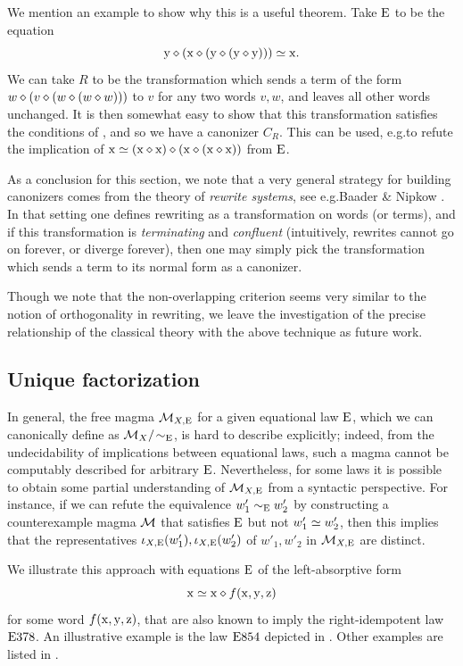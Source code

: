 We mention an example to show why this is a useful theorem. Take $\mathrm{E}$ to be the equation
\[
  \mathrm{y} \diamond (\mathrm{x} \diamond (\mathrm{y} \diamond (\mathrm{y} \diamond \mathrm{y})))\simeq \mathrm{x}.
\]
We can take $R$ to be the transformation which sends a term of the form $w \diamond (v \diamond (w \diamond (w \diamond w)))$ to $v$ for any two words $v, w$, and leaves all other words unchanged.
It is then somewhat easy to show that this transformation satisfies the conditions of , and so we have a canonizer $C_R$.
This can be used, e.g.\@ to refute the implication of $\mathrm{x} \simeq (\mathrm{x} \diamond \mathrm{x}) \diamond (\mathrm{x} \diamond (\mathrm{x} \diamond \mathrm{x}))$ from $\mathrm{E}$.

As a conclusion for this section, we note that a very general strategy for building canonizers comes from the theory of \emph{rewrite systems}, see e.g.\@ Baader \& Nipkow \cite{term-rewriting}.
In that setting one defines rewriting as a transformation on words (or terms), and if this transformation is \emph{terminating} and \emph{confluent} (intuitively, rewrites cannot go on forever, or diverge forever), then one may simply pick the transformation which sends a term to its normal form as a canonizer.

Though we note that the non-overlapping criterion seems very similar to the notion of orthogonality in rewriting, we leave the investigation of the precise relationship of the classical theory with the above technique as future work.

\subsection{Unique factorization}

In general, the free magma ${\mathcal{M}}_{X,\mathrm{E}}$ for a given equational law $\mathrm{E}$, which we can canonically define as ${\mathcal{M}}_X/\!\sim_{\mathrm{E}}$, is hard to describe explicitly; indeed, from the undecidability of implications between equational laws, such a magma cannot be computably described for arbitrary $\mathrm{E}$.  Nevertheless, for some laws it is possible to obtain some partial understanding of ${\mathcal{M}}_{X,\mathrm{E}}$ from a syntactic perspective.  For instance, if we can refute the equivalence $w'_1 \sim_{\mathrm{E}} w'_2$ by constructing a counterexample magma ${\mathcal{M}}$ that satisfies $\mathrm{E}$ but not $w'_1 \simeq w'_2$, then this implies that the representatives $\iota_{X,\mathrm{E}}(w'_1), \iota_{X,\mathrm{E}}(w'_2)$ of  $w'_1, w'_2$ in ${\mathcal{M}}_{X,\mathrm{E}}$ are distinct.

We illustrate this approach with equations $\mathrm{E}$ of the left-absorptive form
\begin{equation}\label{left-absorptive}
\mathrm{x} \simeq \mathrm{x} \diamond f(\mathrm{x},\mathrm{y},\mathrm{z})
\end{equation}
for some word $f(\mathrm{x},\mathrm{y},\mathrm{z})$, that are also known to imply the right-idempotent law $\mathrm{E}378$.  An illustrative example is the law $\mathrm{E}854$ depicted in . Other examples are listed in .

